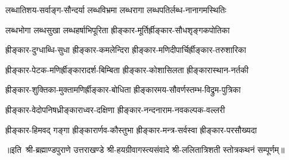 \twolineshloka
{लब्धातिशय-सर्वाङ्ग-सौन्दर्या लब्धविभ्रमा}
{लब्धरागा लब्धपतिर्लब्ध-नानागमस्थितिः}

\twolineshloka
{लब्धभोगा लब्धसुखा लब्धहर्षाभिपूरिता}
{ह्रीङ्कार-मूर्तिर्ह्रीङ्कार-सौधशृङ्गकपोतिका}

\twolineshloka
{ह्रीङ्कार-दुग्धाब्धि-सुधा ह्रीङ्कार-कमलेन्दिरा}
{ह्रीङ्कार-मणिदीपार्चिर्ह्रीङ्कार-तरुशारिका}

\twolineshloka
{ह्रीङ्कार-पेटक-मणिर्ह्रीङ्कारादर्श-बिम्बिता}
{ह्रीङ्कार-कोशासिलता ह्रीङ्कारास्थान-नर्तकी}

\twolineshloka
{ह्रीङ्कार-शुक्तिका-मुक्तामणिर्ह्रीङ्कार-बोधिता}
{ह्रीङ्कारमय-सौवर्णस्तम्भ-विद्रुम-पुत्रिका}

\twolineshloka
{ह्रीङ्कार-वेदोपनिषध्रीङ्काराध्वर-दक्षिणा}
{ह्रीङ्कार-नन्दनाराम-नवकल्पक-वल्लरी}

\twolineshloka
{ह्रीङ्कार-हिमवद् गङ्गा ह्रीङ्कारार्णव-कौस्तुभा}
{ह्रीङ्कार-मन्त्र-सर्वस्वा ह्रीङ्कार-परसौख्यदा}

॥इति~श्री-ब्रह्माण्डपुराणे उत्तराखण्डे श्री-हयग्रीवागस्त्यसंवादे
श्री-ललितात्रिशती स्तोत्रकथनं सम्पूर्णम्॥
